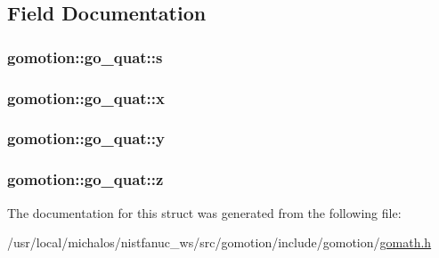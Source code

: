 \subsection{Field Documentation}
\hypertarget{structgomotion_1_1go__quat_aad82d91646627a2c9ca3256d4bede64a}{
\subsubsection[{s}]{ gomotion\-::go\-\_\-quat\-::s}}\label{structgomotion_1_1go__quat_aad82d91646627a2c9ca3256d4bede64a}
\hypertarget{structgomotion_1_1go__quat_a009660cf4962202e569fbe41b490722f}{
\subsubsection[{x}]{ gomotion\-::go\-\_\-quat\-::x}}\label{structgomotion_1_1go__quat_a009660cf4962202e569fbe41b490722f}
\hypertarget{structgomotion_1_1go__quat_a837f1ac99a7c09b80414f232e16ed1de}{
\subsubsection[{y}]{ gomotion\-::go\-\_\-quat\-::y}}\label{structgomotion_1_1go__quat_a837f1ac99a7c09b80414f232e16ed1de}
\hypertarget{structgomotion_1_1go__quat_a1ef5cc0b14458e74b4f47d4ccbc90f39}{
\subsubsection[{z}]{ gomotion\-::go\-\_\-quat\-::z}}\label{structgomotion_1_1go__quat_a1ef5cc0b14458e74b4f47d4ccbc90f39}


The documentation for this struct was generated from the following file\-:\begin{DoxyCompactItemize}
\item 
/usr/local/michalos/nistfanuc\-\_\-ws/src/gomotion/include/gomotion/\hyperlink{gomath_8h}{gomath.\-h}\end{DoxyCompactItemize}
